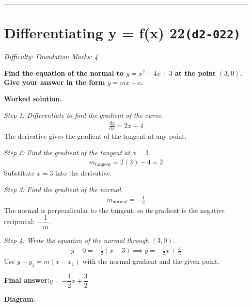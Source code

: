 \documentclass[11pt]{article}
\newcommand{\question}[1]{\par\medskip\noindent\textbf{#1}\par}
\begin{document}
\medskip\hrule

\section*{Differentiating y = f(x) 22\quad\small\texttt{(d2-022)}}
\textit{Difficulty: Foundation \quad\textbar\quad Marks: 4}

\question{Find the equation of the normal to \( y = x^2 - 4x + 3 \) at the point \( (3, 0) \). Give your answer in the form \( y = mx + c \).}

\textbf{Worked solution.}

\textit{Step 1: Differentiate to find the gradient of the curve.}
\[\begin{gathered}
\frac{\mathrm{d}y}{\mathrm{d}x} = 2x - 4
\end{gathered}\]
The derivative gives the gradient of the tangent at any point.

\textit{Step 2: Find the gradient of the tangent at \( x = 3 \).}
\[\begin{gathered}
m_{\text{tangent}} = 2(3) - 4 = 2
\end{gathered}\]
Substitute \( x = 3 \) into the derivative.

\textit{Step 3: Find the gradient of the normal.}
\[\begin{gathered}
m_{\text{normal}} = -\frac{1}{2}
\end{gathered}\]
The normal is perpendicular to the tangent, so its gradient is the negative reciprocal: \( -\dfrac{1}{m} \).

\textit{Step 4: Write the equation of the normal through \( (3, 0) \).}
\[\begin{gathered}
y - 0 = -\tfrac{1}{2}(x - 3) \implies y = -\tfrac{1}{2}x + \tfrac{3}{2}
\end{gathered}\]
Use \( y - y_1 = m(x - x_1) \) with the normal gradient and the given point.

\begin{answerbox}
\textbf{Final answer:}\quad \(\displaystyle  y = -\dfrac{1}{2}x + \dfrac{3}{2} \)
\end{answerbox}
\textbf{Diagram.}
\end{document}
